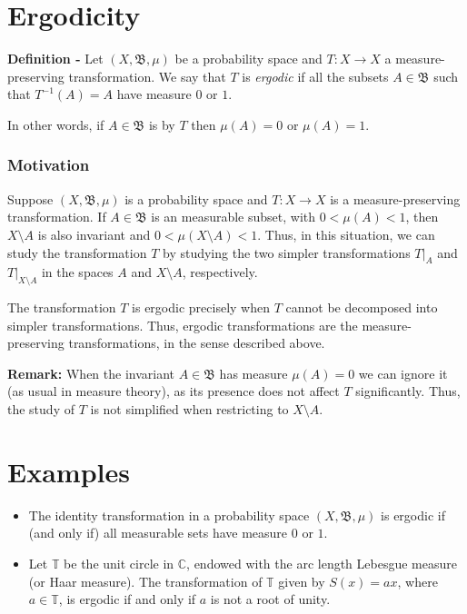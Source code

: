 \documentclass{article}
\begin{document}

\section{Ergodicity}

{\bf Definition -} Let $(X, \mathfrak{B}, \mu)$ be a probability space and $T:X \longrightarrow X$ a measure-preserving transformation.  We say that $T$ is \emph{ergodic} if all the subsets $A \in \mathfrak{B}$ such that $T^{-1}(A)=A$ have measure $0$ or $1$.

In other words, if $A \in \mathfrak{B}$ is  by $T$ then $\mu(A) = 0$ or $\mu(A)=1$.\\

\subsubsection{Motivation}

Suppose $(X, \mathfrak{B}, \mu)$ is a probability space and $T:X \longrightarrow X$ is a measure-preserving transformation. If $A \in \mathfrak{B}$ is an  measurable subset, with $0 < \mu(A) < 1$, 
then $X \setminus A$ is also invariant and $0 < \mu(X \setminus A) < 1$. Thus, in this situation, we can study the transformation $T$ by studying the two simpler transformations $T|_{A}$ and $T|_{X \setminus A}$ in the spaces $A$ and $X \setminus A$, respectively.

The transformation $T$ is ergodic precisely when $T$ cannot be decomposed into simpler transformations. Thus, ergodic transformations are the \emph{} measure-preserving transformations, in the sense described above.

{\bf Remark:} When the invariant  $A \in \mathfrak{B}$ has measure $\mu(A)=0$ we can ignore it (as usual in measure theory), as its presence does not affect $T$ significantly. Thus, the study of $T$ is not simplified when restricting to $X \setminus A$.

\section{Examples}

\begin{itemize}
\item The identity transformation in a probability space $(X, \mathfrak{B}, \mu)$ is ergodic if (and only if) all measurable sets have measure $0$ or $1$.
\end{itemize}
\begin{itemize}
\item Let $\mathbb{T}$ be the unit circle in $\mathbb{C}$, endowed with the arc length Lebesgue measure (or Haar measure). The transformation of $\mathbb{T}$ given by $S(x)= ax$, where $a \in \mathbb{T}$, is ergodic if and only if $a$ is not a root of unity.
\end{itemize}
\end{document}
